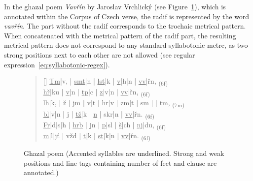 In the ghazal poem \emph{Vavřín} by Jaroslav Vrchlický (see Figure~\ref{fig:ghazal}), which is annotated within the Corpus of Czech verse, the radif is represented by the word \emph{vavřín}. The part without the radif corresponds to the trochaic metrical pattern.~\cite{GitCorpusCzechVerse} When concatenated with the metrical pattern of the radif part, the resulting metrical pattern does not correspond to any standard syllabotonic metre, as two strong positions next to each other are not allowed (see regular expression~\eqref{eq:syllabotonic-regex}).

\begin{figure}[htpb]
    \centering
    \begin{verse}[\versewidth]
    \uline{Tm}|v, | \uline{smt}|n | \uline{lst}|k | \uline{v}|h|n | \uline{vv}|řn, \textsubscript{(6f)}\\
    \uline{hř}|ku | \uline{v}|n | \uline{tp}|c | \uline{z}|v|n | \uline{vv}|řn, \textsubscript{(6f)}\\
    \uline{lh}|k, | \uline{ž} | jm | \uline{v}|t | \uline{hr}|v | \uline{zm}|t | sm | \uline{} | tm, \textsubscript{(7m)}\\
    \uline{bl}|v|n | j | \uline{tž}|k | \uline{n} | skr|n | \uline{vv}|řn. \textsubscript{(6f)}\\
    \uline{Fr}|d|s|h | \uline{hrb} | jn | \uline{p}|sl | \uline{š}|ch | \uline{nj}|du, \textsubscript{(6f)}\\
    \uline{m}|l|jť | vžd | \uline{t}|k | \uline{st}|k|n | \uline{vv}|řn. \textsubscript{(6f)}\\
    \end{verse}
    \caption[Ghazal poem]{Ghazal poem (Accented syllables are underlined. Strong and weak positions and line tags containing number of feet and clause are annotated.)}\label{fig:ghazal}
\end{figure}